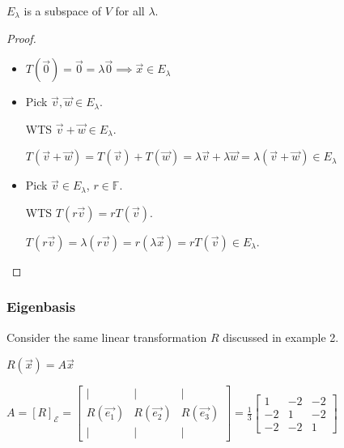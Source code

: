 \documentclass[11pt,fleqn]{book} %
\begin{document}
\setcounter{chapter}{4}
\setcounter{dummy}{6}
\begin{proposition}
$E_\lambda$ is a subspace of $V$ for all $\lambda$.
\end{proposition}
\setcounter{chapter}{3}

\begin{proof}
    \begin{itemize}
        \item $T(\overrightarrow{0}) = \overrightarrow{0} = \lambda\overrightarrow{0} \implies \overrightarrow{x} \in E_\lambda$

        \item Pick $\overrightarrow{v}, \overrightarrow{w} \in E_\lambda$.

        WTS $\overrightarrow{v} + \overrightarrow{w} \in E_\lambda$.

        $T(\overrightarrow{v} + \overrightarrow{w}) = T(\overrightarrow{v}) + T(\overrightarrow{w}) = \lambda\overrightarrow{v} + \lambda \overrightarrow{w} = \lambda(\overrightarrow{v} + \overrightarrow{w}) \in E_\lambda$

        \item Pick $\overrightarrow{v} \in E_\lambda$, $r \in \mathbb{F}$.

        WTS $T(r\overrightarrow{v}) = rT(\overrightarrow{v})$.

        $T(r\overrightarrow{v}) = \lambda(r\overrightarrow{v}) = r(\lambda\overrightarrow{x}) = rT(\overrightarrow{v}) \in E_\lambda$.
    \end{itemize}
\end{proof}

\subsubsection{Eigenbasis}

Consider the same linear transformation $R$ discussed in example 2.

$R(\overrightarrow{x}) = A\overrightarrow{x}$

$A=[R]_\mathcal{E} = \begin{bmatrix} | &| &| \\ R(\overrightarrow{e_1}) &R(\overrightarrow{e_2}) &R(\overrightarrow{e_3}) \\ | &| &| \end{bmatrix} = \frac{1}{3}\begin{bmatrix} 1 &-2 &-2 \\ -2 &1 &-2 \\ -2 &-2 &1 \end{bmatrix}$
\end{document}
